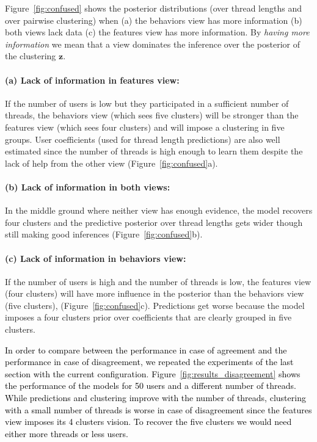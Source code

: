 \documentclass[smallextended]{svjour3}          %
\newcommand\alberto[1]{\textcolor{black}{#1}}
\begin{document}
Figure~\ref{fig:confused} shows the posterior distributions (over thread lengths and over pairwise clustering) when (a) the behaviors view has more information (b) both views lack data (c) the features view has more information. By \textit{having more information} we mean that a view dominates the inference over the posterior of the clustering $\mathbf{z}$. 

\paragraph{(a) Lack of information in features view:}
If the number of users is low but they participated in a sufficient number of threads, the behaviors view (which sees five clusters) will be stronger than the features view (which sees four clusters) and will impose a clustering in five groups. User coefficients (used for thread length predictions) are also well estimated since the number of threads is high enough to learn them despite the lack of help from the other view (Figure~\ref{fig:confused}a).

\paragraph{(b) Lack of information in both views:}
In the middle ground where neither view has enough evidence, the model recovers four clusters and the predictive posterior over thread lengths gets wider though still making good inferences (Figure~\ref{fig:confused}b).

\paragraph{(c) Lack of information in behaviors view:}
If the number of users is high and the number of threads is low, the features view (four clusters) will have more influence in the posterior than the behaviors view (five clusters), (Figure~\ref{fig:confused}c). Predictions get worse because the model imposes a four clusters prior over coefficients that are clearly grouped in five clusters.

\alberto{In order to compare between the performance in case of agreement and the performance in case of disagreement, we repeated the experiments of the last section with the current configuration}. 
\alberto{Figure~\ref{fig:results_disagreement} shows the performance of the models for 50 users and a different number of threads. While predictions and clustering improve with the number of threads, clustering with a small number of threads is worse in case of disagreement since the features view imposes its 4 clusters vision. To recover the five clusters we would need either more  threads or less users.}
\end{document}
